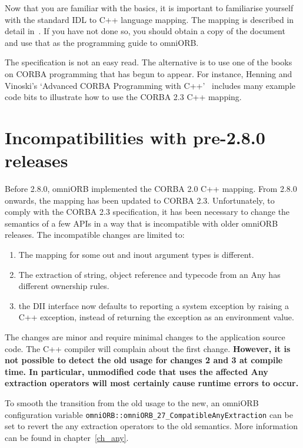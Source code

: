 \documentclass[11pt,twoside,a4paper]{book}
\newcommand{\code}[1]{\texttt{#1}}
\begin{document}
Now that you are familiar with the basics, it is important to
familiarise yourself with the standard IDL to C++ language mapping.
The mapping is described in detail in~\cite{corba23-spec}. If you have
not done so, you should obtain a copy of the document and use that as
the programming guide to omniORB.

The specification is not an easy read. The alternative is to use one
of the books on CORBA programming that has begun to appear. For
instance, Henning and Vinoski's `Advanced CORBA Programming with
C++'~\cite{henning1999} includes many example code bits to illustrate
how to use the CORBA 2.3 C++ mapping.

\section{Incompatibilities with pre-2.8.0 releases}

Before 2.8.0, omniORB implemented the CORBA 2.0 C++ mapping. From
2.8.0 onwards, the mapping has been updated to CORBA 2.3.
Unfortunately, to comply with the CORBA 2.3 specification, it has been
necessary to change the semantics of a few APIs in a way that is
incompatible with older omniORB releases. The incompatible changes are
limited to:

\begin{enumerate}
\item The mapping for some out and inout argument types is different.

\item The extraction of string, object reference and typecode from an
Any has different ownership rules.

\item the DII interface now defaults to reporting a system exception
by raising a C++ exception, instead of returning the exception as an
environment value.

\end{enumerate}

The changes are minor and require minimal changes to the application
source code. The C++ compiler will complain about the first change.
\textbf{However, it is not possible to detect the old usage for
changes 2 and 3 at compile time. In particular, unmodified code that
uses the affected Any extraction operators will most certainly cause
runtime errors to occur.}

To smooth the transition from the old usage to the new, an omniORB
configuration variable
\code{omniORB::omniORB\_27\_CompatibleAnyExtraction} can be set to
revert the any extraction operators to the old semantics. More
information can be found in chapter~\ref{ch_any}.
\end{document}
